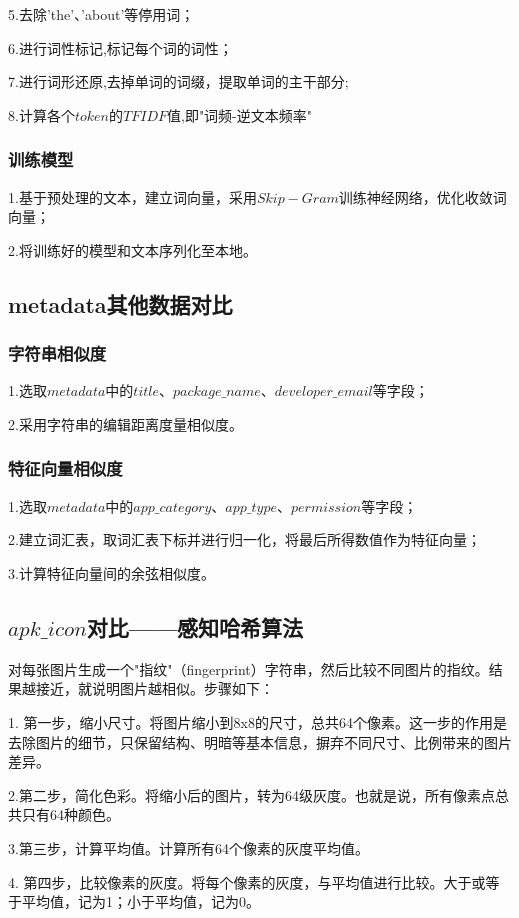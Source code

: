 \documentclass[UTF8,a4paper,10pt, twocolumn]{ctexart}
\begin{document}
5.去除'the'、'about'等停用词；

6.进行词性标记,标记每个词的词性；

7.进行词形还原,去掉单词的词缀，提取单词的主干部分;

8.计算各个$token$的$TFIDF$值,即"词频-逆文本频率"

\subsubsection{训练模型}
1.基于预处理的文本，建立词向量，采用$Skip-Gram$训练神经网络，优化收敛词向量；

2.将训练好的模型和文本序列化至本地。

\subsection{metadata其他数据对比}
\subsubsection{字符串相似度}
1.选取$metadata$中的$title$、$package\_name$、$developer\_email$等字段；

2.采用字符串的编辑距离度量相似度。

\subsubsection{特征向量相似度}
1.选取$metadata$中的$app\_category$、$app\_type$、$permission$等字段；

2.建立词汇表，取词汇表下标并进行归一化，将最后所得数值作为特征向量；

3.计算特征向量间的余弦相似度。

\subsection{$apk\_icon$对比——感知哈希算法}
对每张图片生成一个"指纹"（fingerprint）字符串，然后比较不同图片的指纹。结果越接近，就说明图片越相似。步骤如下：

1. 第一步，缩小尺寸。将图片缩小到8x8的尺寸，总共64个像素。这一步的作用是去除图片的细节，只保留结构、明暗等基本信息，摒弃不同尺寸、比例带来的图片差异。

2.第二步，简化色彩。将缩小后的图片，转为64级灰度。也就是说，所有像素点总共只有64种颜色。

3.第三步，计算平均值。计算所有64个像素的灰度平均值。

4. 第四步，比较像素的灰度。将每个像素的灰度，与平均值进行比较。大于或等于平均值，记为1；小于平均值，记为0。
\end{document}

